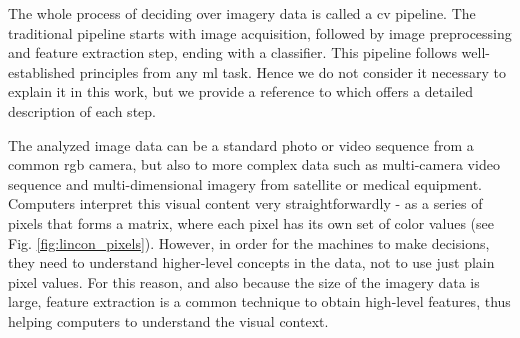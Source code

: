         The whole process of deciding over imagery data is called a \gls{cv} pipeline. The traditional pipeline starts with image acquisition, followed by image preprocessing and feature extraction step, ending with a classifier. This pipeline follows well-established principles from any \gls{ml} task. Hence we do not consider it necessary to explain it in this work, but we provide a reference to \cite{koenpieline} which offers a detailed description of each step.
    
        The analyzed image data can be a standard photo or video sequence from a common \gls{rgb} camera, but also to more complex data such as multi-camera video sequence and multi-dimensional imagery from satellite or medical equipment. Computers interpret this visual content very straightforwardly - as a series of pixels that forms a matrix, where each pixel has its own set of color values (see Fig. \ref{fig:lincon_pixels}). However, in order for the machines to make decisions, they need to understand higher-level concepts in the data, not to use just plain pixel values. For this reason, and also because the size of the imagery data is large, feature extraction is a common technique to obtain high-level features, thus helping computers to understand the visual context. 
        
